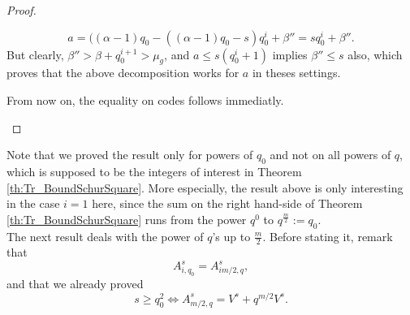 \documentclass[a4paper]{article}
\newcommand{\calH}{\mathcal{H}}
\begin{document}
\begin{proof}
\begin{enumerate}
\begin{itemize}
\begin{itemize}
        \[ a = ((\alpha-1)q_0 - ((\alpha-1)q_0-s)q_0^i + \beta'' = sq_0^i + \beta''.\]
        But clearly, $\beta'' > \beta + q_0^{i+1} > \mu_g$, and $a \leq s(q_0^i+1)$ implies $\beta'' \leq s$ also, which proves that the above decomposition works for $a$ in theses settings.
    \end{itemize}
From now on, the equality on codes follows immediatly.
\end{itemize}
\end{enumerate}
\end{proof}


Note that we proved the result only for powers of $q_0$ and not on all powers of $q$, which is supposed to be the integers of interest in Theorem \ref{th:Tr_BoundSchurSquare}. More especially, the result above is only interesting in the case $i=1$ here, since the sum on the right hand-side of Theorem \ref{th:Tr_BoundSchurSquare} runs from the power $q^0$ to $q^{\frac{m}{2} }:=q_0$. \\
The next result deals with the power of $q$'s up to $\frac{m}{2}$. Before stating it, remark that 
\[ A_{i,q_0}^s = A^s_{im/2,q},\]
and that we already proved
\[ s \geq q_0^2 \iff A^s_{m/2,q}=V^s+q^{m/2}V^s.\]
\end{document}

